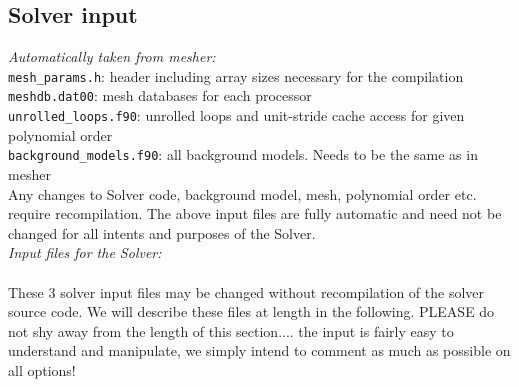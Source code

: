 \documentclass[11pt,letter,fleqn,english,notitlepage]{article}
\begin{document}

\subsection{Solver input}

\textit{Automatically taken from mesher:} \\
{\tt mesh\_params.h}: header including array sizes necessary for the compilation\\
{\tt meshdb.dat00\*}: mesh databases for each processor\\
{\tt unrolled\_loops.f90}: unrolled loops and unit-stride cache access for given polynomial order\\
{\tt background\_models.f90}: all background models. Needs to be the same as in mesher\\

\noindent Any changes to Solver code, background model, mesh, polynomial order etc. require 
recompilation. The above input files are fully automatic and need not be changed for all intents 
and purposes of the Solver.\\

\noindent \textit{Input files for the Solver:} \\
\\
These 3 solver input files may be changed without recompilation of the solver 
source code. We will describe these files at length in the following. PLEASE do not shy away from the 
length of this section.... the input is fairly easy to understand and manipulate, 
we simply intend to comment as much as possible on all options!\\
\end{document}
